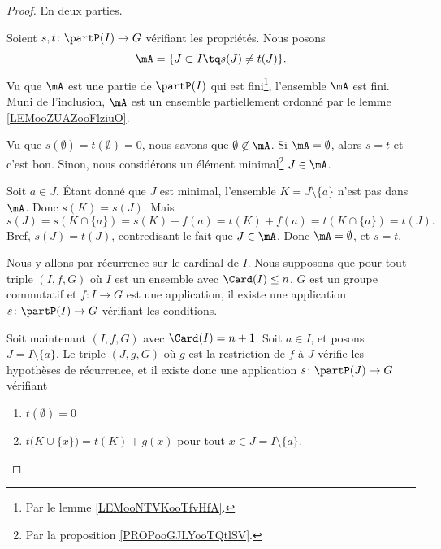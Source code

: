 \begin{proof}
	En deux parties.
	\begin{subproof}
		\spitem[Unicité]
		Soient \(s,t \colon \partP(I)\to G  \) vérifiant les propriétés. Nous posons
		\begin{equation}
			\mA=\{ J\subset I\tq s(J)\neq t(J) \}.
		\end{equation}
		Vu que \( \mA\) est une partie de \( \partP(I)\) qui est fini\footnote{Par le lemme \ref{LEMooNTVKooTfvHfA}.}, l'ensemble \( \mA\) est fini. Muni de l'inclusion, \( \mA\) est un ensemble partiellement ordonné par le lemme \ref{LEMooZUAZooFlziuO}.

		Vu que \( s(\emptyset)=t(\emptyset)=0\), nous savons que \( \emptyset\not\in \mA\). Si \( \mA=\emptyset\), alors \( s=t\) et c'est bon. Sinon, nous considérons un élément minimal\footnote{Par la proposition \ref{PROPooGJLYooTQtlSV}.} \( J\in \mA\).

		Soit \( a\in J\). Étant donné que \( J\) est minimal, l'ensemble \( K=J\setminus\{ a \}\) n'est pas dans \( \mA\). Donc \( s(K)=s(J)\). Mais
		\begin{equation}
			s(J)=s(K\cap\{ a \})=s(K)+f(a)=t(K)+f(a)=t(K\cap\{ a \})=t(J).
		\end{equation}
		Bref, \( s(J)=t(J)\), contredisant le fait que \( J\in\mA\). Donc \( \mA=\emptyset\), et \( s=t\).

		\spitem[Existence]
		Nous y allons par récurrence sur le cardinal de \( I\). Nous supposons que pour tout triple \( (I,f,G)\) où \( I\) est un ensemble avec \( \Card(I)\leq n\), \( G\) est un groupe commutatif et \(f \colon I\to G  \) est une application, il existe une application \(s \colon \partP(I)\to G  \) vérifiant les conditions.

		Soit maintenant \( (I,f,G)\) avec \( \Card(I)=n+1\). Soit \( a\in I\), et posons \( J=I\setminus\{ a \}\). Le triple \( (J,g,G)\) où \( g\) est la restriction de \( f\) à \( J\) vérifie les hypothèses de récurrence, et il existe donc une application \(s \colon \partP(J)\to G  \) vérifiant
		\begin{enumerate}
			\item
			      \( t(\emptyset)=0\)
			\item
			      \( t\big( K\cup\{ x \} \big)=t(K)+g(x)\) pour tout \( x\in J=I\setminus\{ a \}\).
		\end{enumerate}


\end{subproof}
\end{proof}
